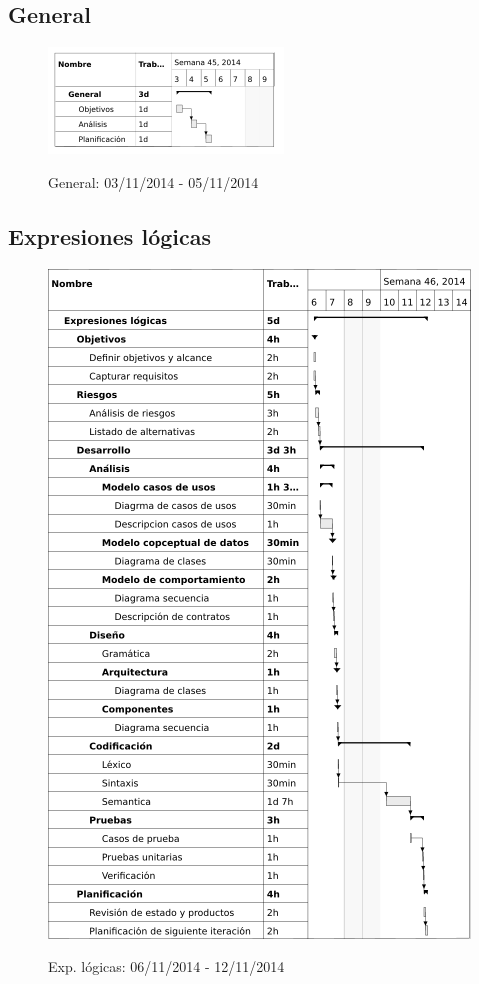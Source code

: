 \subsection{General}
\begin{center}
\begin{figure}[h]
\centering
\includegraphics[scale=1]{planning/general.png} \\
\caption{General: 03/11/2014 - 05/11/2014 }
\end{figure}
\end{center}

\subsection{Expresiones lógicas}

\begin{center}
\begin{figure}[H]
\centering
\includegraphics[scale=1]{planning/2-expresiones-logicas.png} \\
\caption{Exp. lógicas: 06/11/2014 - 12/11/2014 }
\end{figure}
\end{center}

